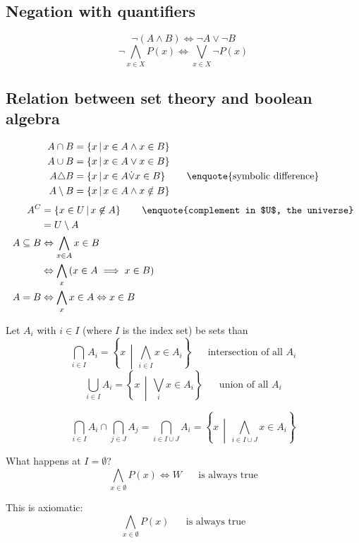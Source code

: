 \documentclass[a4paper,landscape,twocolumn]{article}
\newcommand\setdef[2]{\left\{#1\,\middle|\,#2\right\}}
\newcommand\mathspace{\hspace{20pt}}
\begin{document}
\subsection{Negation with quantifiers}

\[ \neg(A \land B) \Leftrightarrow \neg A \lor \neg B \]
\[ \neg \bigwedge_{x \in X} P(x) \Leftrightarrow \bigvee_{x \in X} \neg P(x) \]

\subsection{Relation between set theory and boolean algebra}

\begin{align*}
  A \cap B &= \setdef{x}{x \in A \land x \in B} \\
  A \cup B &= \setdef{x}{x \in A \lor x \in B} \\
  A \triangle B &= \setdef{x}{x \in A \dot\lor x \in B} \mathspace \text{\enquote{symbolic difference}} \\
  A \setminus B &= \setdef{x}{x \in A \land x \notin B}
\end{align*}
\begin{align*}
  A^C &= \setdef{x \in U}{x \not\in A} \mathspace \text{\enquote{complement in $U$, the universe}} \\
      &= U \setminus A \\
  A \subseteq B &\Leftrightarrow \bigwedge_{x \in A} x \in B \\
                &\Leftrightarrow \bigwedge_{x} \left(x \in A \implies x \in B\right) \\
  A = B &\Leftrightarrow \bigwedge_x x \in A \Leftrightarrow x \in B
\end{align*}

Let $A_i$ with $i \in I$ (where $I$ is the index set) be sets than
\[ \bigcap_{i \in I} A_i = \setdef{x}{\bigwedge_{i \in I} x \in A_i} \mathspace \text{intersection of all $A_i$} \]
\[ \bigcup_{i \in I} A_i = \setdef{x}{\bigvee_i x \in A_i} \mathspace \text{union of all $A_i$} \]

\[
    \bigcap_{i \in I} A_i \cap \bigcap_{j \in J} A_j
    = \bigcap_{i \in I \cup J} A_i
    = \setdef{x}{\bigwedge_{i \in I \cup J} x \in A_i}
\]

What happens at $I = \emptyset$?
\[ \bigwedge_{x \in \emptyset} P(x) \Leftrightarrow W \mathspace\text{is always true} \]

This is axiomatic:
\[ \bigwedge_{x \in \emptyset} P(x) \mathspace \text{is always true} \]
\end{document}
